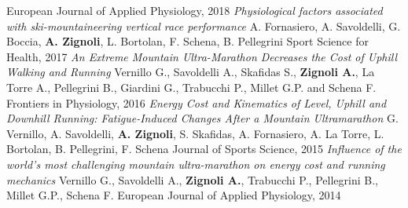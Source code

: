 \documentclass[helvetica,openbib,logo,notitle,flagCMYK,totpages]{europecv}
\begin{document}
\begin{europecv}
{	\newline 
			European Journal of Applied Physiology, 2018
	\newline
	\newline
	\emph{Physiological factors associated with ski-mountaineering vertical race performance}
	\newline 
	A. Fornasiero, A. Savoldelli, G. Boccia, \textbf{A. Zignoli}, L. Bortolan, F. Schena, B. Pellegrini 
	\newline 
	Sport Science for Health, 2017  
	\newline
	\newline
	\emph{An Extreme Mountain Ultra-Marathon Decreases the Cost of 	Uphill Walking and Running} 
	\newline 
	Vernillo G., Savoldelli A., Skafidas S., \textbf{Zignoli A.}, La Torre A., Pellegrini B., Giardini G., Trabucchi P., Millet G.P. and Schena F.
	\newline 
	Frontiers in Physiology, 2016
	\newline
	\newline
	\emph{Energy Cost and Kinematics of Level, Uphill and Downhill Running: Fatigue-Induced Changes After a Mountain Ultramarathon} 
	\newline 
   G. Vernillo, A. Savoldelli, \textbf{A. Zignoli}, S. Skafidas, A. Fornasiero, A. La Torre, L. Bortolan, B. Pellegrini, F. Schena
   \newline 
   Journal of Sports Science, 2015
   \newline
   \newline
   \emph{Influence of the world's most challenging mountain ultra-marathon on energy cost and running mechanics} \newline
   Vernillo G., Savoldelli A., \textbf{Zignoli A.}, Trabucchi P., Pellegrini B., Millet G.P., Schena F. \newline
   European Journal of Applied Physiology, 2014
   \newline
}
\end{europecv}
\end{document}
